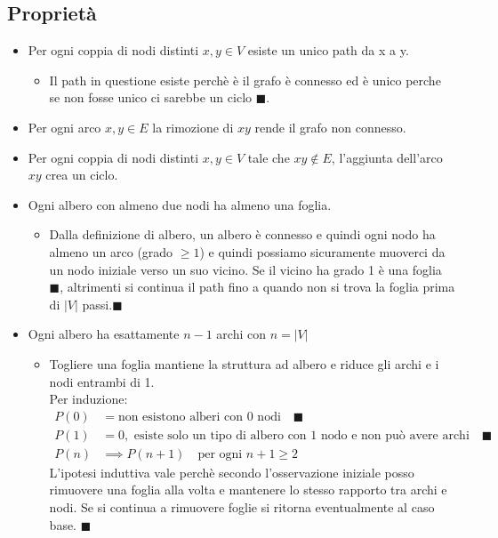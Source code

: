 \documentclass[a4paper,12pt]{article}
\begin{document}
\subsection{Proprietà}
\begin{itemize}
    \item Per ogni coppia di nodi distinti $x,y \in V$ esiste un unico path da x a y.
    \begin{itemize}
        \item Il path in questione esiste perchè è il grafo è connesso ed è unico perche se non fosse unico ci sarebbe un ciclo $\blacksquare$.
    \end{itemize}
    \item Per ogni arco $x,y \in E$ la rimozione di $xy$ rende il grafo non connesso.
    \item Per ogni coppia di nodi distinti $x,y \in V$ tale che $xy \notin E$, l'aggiunta dell'arco $xy$ crea un ciclo.
    \item Ogni albero con almeno due nodi ha almeno una foglia.
    \begin{itemize}
        \item Dalla definizione di albero, un albero è connesso e quindi ogni nodo ha almeno un arco (grado $\ge 1$) e quindi possiamo sicuramente muoverci da un nodo iniziale verso un suo vicino. Se il vicino ha grado 1 è una foglia $\blacksquare$, altrimenti si continua il path fino a quando non si trova la foglia prima di $|V|$ passi.$\blacksquare$
    \end{itemize}
    \item Ogni albero ha esattamente $n-1$ archi con $n = |V|$
    \begin{itemize}
        \item Togliere una foglia mantiene la struttura ad albero e riduce gli archi e i nodi entrambi di 1. \\Per induzione:
        \begin{align*}
            P(0) &= \text{non esistono alberi con 0 nodi} \quad \blacksquare \\
            P(1) &= 0, \text{ esiste solo un tipo di albero con 1 nodo e non può avere archi} \quad \blacksquare \\
            P(n) &\implies P(n+1) \quad \text{per ogni } n+1 \geq 2
        \end{align*}
        L'ipotesi induttiva vale perchè secondo l'osservazione iniziale posso rimuovere una foglia alla volta e mantenere lo stesso rapporto tra archi e nodi.
        Se si continua a rimuovere foglie si ritorna eventualmente al caso base. $\blacksquare$
    \end{itemize}
\end{itemize}
\end{document}
